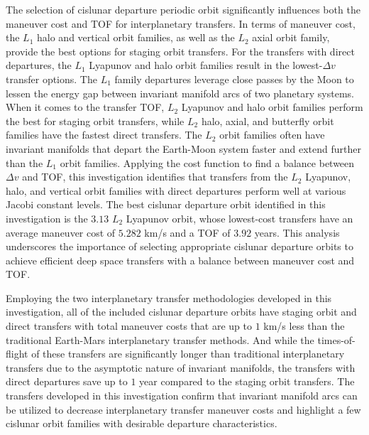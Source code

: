 The selection of cislunar departure periodic orbit significantly influences both the maneuver cost
and TOF for interplanetary transfers. In terms of maneuver cost, the $L_{1}$ halo and vertical
orbit families, as well as the $L_{2}$ axial orbit family, provide the best options for staging
orbit transfers. For the transfers with direct departures, the $L_{1}$ Lyapunov and halo orbit
families result in the lowest-$\Delta v$ transfer options. The $L_{1}$ family departures leverage
close passes by the Moon to lessen the energy gap between invariant manifold arcs of two planetary
systems. When it comes to the transfer TOF, $L_{2}$ Lyapunov and halo orbit families perform the
best for staging orbit transfers, while $L_{2}$ halo, axial, and butterfly orbit families have the
fastest direct transfers. The $L_{2}$ orbit families often have invariant manifolds that depart the
Earth-Moon system faster and extend further than the $L_{1}$ orbit families. Applying the cost
function to find a balance between $\Delta v$ and TOF, this investigation identifies that transfers
from the $L_{2}$ Lyapunov, halo, and vertical orbit families with direct departures perform well at
various Jacobi constant levels. The best cislunar departure orbit identified in this investigation
is the $3.13$ $L_{2}$ Lyapunov orbit, whose lowest-cost transfers have an average maneuver cost of
$5.282$ km/s and a TOF of $3.92$ years. This analysis underscores the importance of selecting
appropriate cislunar departure orbits to achieve efficient deep space transfers with a balance
between maneuver cost and TOF.

Employing the two interplanetary transfer methodologies developed in this investigation, all of the
included cislunar departure orbits have staging orbit and direct transfers with total maneuver
costs that are up to $1$ km/s less than the traditional Earth-Mars interplanetary transfer methods.
And while the times-of-flight of these transfers are significantly longer than traditional
interplanetary transfers due to the asymptotic nature of invariant manifolds, the transfers with
direct departures save up to $1$ year compared to the staging orbit transfers. The transfers
developed in this investigation confirm that invariant manifold arcs can be utilized to decrease
interplanetary transfer maneuver costs and highlight a few cislunar orbit families with desirable
departure characteristics.

